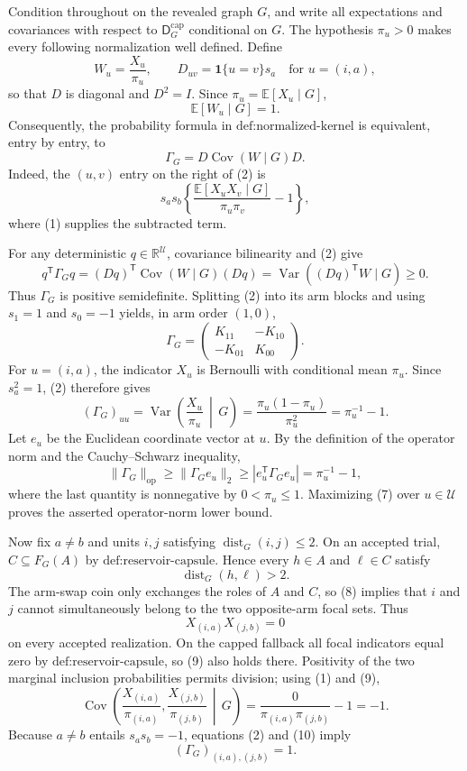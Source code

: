 Condition throughout on the revealed graph \(G\), and write all expectations and covariances with respect to \(\mathsf D_G^{\mathrm{cap}}\) conditional on \(G\).  The hypothesis \(\pi_u>0\) makes every following normalization well defined.  Define
\[
 W_u=\frac{X_u}{\pi_u},
 \qquad
 D_{uv}=\mathbf 1\{u=v\}s_a
 \quad\text{for }u=(i,a),
\]
so that \(D\) is diagonal and \(D^2=I\).  Since \(\pi_u=\mathbb E[X_u\mid G]\),
\[
 \mathbb E[W_u\mid G]=1. \tag{1}
\]
Consequently, the probability formula in \(\text{def:normalized-kernel}\) is equivalent, entry by entry, to
\[
 \Gamma_G=D\operatorname{Cov}(W\mid G)D. \tag{2}
\]
Indeed, the \((u,v)\) entry on the right of (2) is
\[
 s_as_b\left\{
 \frac{\mathbb E[X_uX_v\mid G]}{\pi_u\pi_v}-1
 \right\}, \tag{3}
\]
where (1) supplies the subtracted term.

For any deterministic \(q\in\mathbb R^{\mathcal U}\), covariance bilinearity and (2) give
\[
 q^{\mathsf T}\Gamma_Gq
 =(Dq)^{\mathsf T}\operatorname{Cov}(W\mid G)(Dq)
 =\operatorname{Var}\!\left((Dq)^{\mathsf T}W\mid G\right)
 \ge 0. \tag{4}
\]
Thus \(\Gamma_G\) is positive semidefinite.  Splitting (2) into its arm blocks and using \(s_1=1\) and \(s_0=-1\) yields, in arm order \((1,0)\),
\[
 \Gamma_G=
 \begin{pmatrix}
 K_{11}&-K_{10}\\
 -K_{01}&K_{00}
 \end{pmatrix}. \tag{5}
\]
For \(u=(i,a)\), the indicator \(X_u\) is Bernoulli with conditional mean \(\pi_u\).  Since \(s_a^2=1\), (2) therefore gives
\[
 (\Gamma_G)_{uu}
 =\operatorname{Var}\!\left(\frac{X_u}{\pi_u}\,\middle|\,G\right)
 =\frac{\pi_u(1-\pi_u)}{\pi_u^2}
 =\pi_u^{-1}-1. \tag{6}
\]
Let \(e_u\) be the Euclidean coordinate vector at \(u\).  By the definition of the operator norm and the Cauchy--Schwarz inequality,
\[
 \|\Gamma_G\|_{\mathrm{op}}
 \ge \|\Gamma_Ge_u\|_2
 \ge \left|e_u^{\mathsf T}\Gamma_Ge_u\right|
 =\pi_u^{-1}-1, \tag{7}
\]
where the last quantity is nonnegative by \(0<\pi_u\le1\).  Maximizing (7) over \(u\in\mathcal U\) proves the asserted operator-norm lower bound.

Now fix \(a\ne b\) and units \(i,j\) satisfying \(\operatorname{dist}_G(i,j)\le2\).  On an accepted trial, \(C\subseteq F_G(A)\) by \(\text{def:reservoir-capsule}\).  Hence every \(h\in A\) and \(\ell\in C\) satisfy
\[
 \operatorname{dist}_G(h,\ell)>2. \tag{8}
\]
The arm-swap coin only exchanges the roles of \(A\) and \(C\), so (8) implies that \(i\) and \(j\) cannot simultaneously belong to the two opposite-arm focal sets.  Thus
\[
 X_{(i,a)}X_{(j,b)}=0 \tag{9}
\]
on every accepted realization.  On the capped fallback all focal indicators equal zero by \(\text{def:reservoir-capsule}\), so (9) also holds there.  Positivity of the two marginal inclusion probabilities permits division; using (1) and (9),
\[
 \operatorname{Cov}\!\left(
 \frac{X_{(i,a)}}{\pi_{(i,a)}},
 \frac{X_{(j,b)}}{\pi_{(j,b)}}\,\middle|\,G
 \right)
 =\frac{0}{\pi_{(i,a)}\pi_{(j,b)}}-1
 =-1. \tag{10}
\]
Because \(a\ne b\) entails \(s_as_b=-1\), equations (2) and (10) imply
\[
 (\Gamma_G)_{(i,a),(j,b)}=1. \tag{11}
\]


